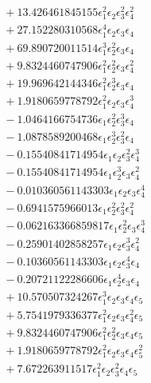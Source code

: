 \documentclass[10pt]{article}
\begin{document}
\begin{align*}
&{}  + 13.426461845155 \epsilon_{1}^{2} \epsilon_{2} \epsilon_{3}^{2} \epsilon_{4}^{2} \\
&{}  + 27.152280310568 \epsilon_{1}^{4} \epsilon_{2} \epsilon_{3} \epsilon_{4} \\
&{}  + 69.890720011514 \epsilon_{1}^{3} \epsilon_{2}^{2} \epsilon_{3} \epsilon_{4} \\
&{}  + 9.8324460747906 \epsilon_{1}^{2} \epsilon_{2}^{2} \epsilon_{3} \epsilon_{4}^{2} \\
&{}  + 19.969642144346 \epsilon_{1}^{2} \epsilon_{2}^{3} \epsilon_{3} \epsilon_{4} \\
&{}  + 1.9180659778792 \epsilon_{1}^{2} \epsilon_{2} \epsilon_{3} \epsilon_{4}^{3} \\
&{}  - 1.0464166754736 \epsilon_{1} \epsilon_{2}^{2} \epsilon_{3}^{3} \epsilon_{4} \\
&{}  - 1.0878589200468 \epsilon_{1} \epsilon_{2}^{3} \epsilon_{3}^{2} \epsilon_{4} \\
&{}  - 0.15540841714954 \epsilon_{1} \epsilon_{2} \epsilon_{3}^{2} \epsilon_{4}^{3} \\
&{}  - 0.15540841714954 \epsilon_{1} \epsilon_{2}^{3} \epsilon_{3} \epsilon_{4}^{2} \\
&{}  - 0.010360561143303 \epsilon_{1} \epsilon_{2} \epsilon_{3} \epsilon_{4}^{4} \\
&{}  - 0.6941575966013 \epsilon_{1} \epsilon_{2}^{2} \epsilon_{3}^{2} \epsilon_{4}^{2} \\
&{}  - 0.062163366859817 \epsilon_{1} \epsilon_{2}^{2} \epsilon_{3} \epsilon_{4}^{3} \\
&{}  - 0.25901402858257 \epsilon_{1} \epsilon_{2} \epsilon_{3}^{3} \epsilon_{4}^{2} \\
&{}  - 0.10360561143303 \epsilon_{1} \epsilon_{2} \epsilon_{3}^{4} \epsilon_{4} \\
&{}  - 0.20721122286606 \epsilon_{1} \epsilon_{2}^{4} \epsilon_{3} \epsilon_{4} \\
&{}  + 10.570507324267 \epsilon_{1}^{3} \epsilon_{2} \epsilon_{3} \epsilon_{4} \epsilon_{5} \\
&{}  + 5.7541979336377 \epsilon_{1}^{2} \epsilon_{2} \epsilon_{3} \epsilon_{4}^{2} \epsilon_{5} \\
&{}  + 9.8324460747906 \epsilon_{1}^{2} \epsilon_{2}^{2} \epsilon_{3} \epsilon_{4} \epsilon_{5} \\
&{}  + 1.9180659778792 \epsilon_{1}^{2} \epsilon_{2} \epsilon_{3} \epsilon_{4} \epsilon_{5}^{2} \\
&{}  + 7.672263911517 \epsilon_{1}^{2} \epsilon_{2} \epsilon_{3}^{2} \epsilon_{4} \epsilon_{5} \\

\end{align*}
\end{document}
